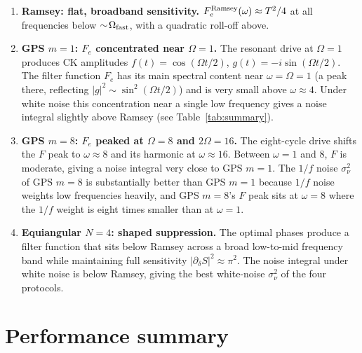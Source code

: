 \documentclass[12pt]{article}
\begin{document}
\begin{enumerate}

    \item \textbf{Ramsey: flat, broadband sensitivity.}
          $F_e^{\rm Ramsey}(\omega) \approx T^2/4$ at all frequencies below
          $\sim\!\Omega_{\rm fast}$, with a quadratic roll-off above.

    \item \textbf{GPS $m=1$: $F_e$ concentrated near $\Omega = 1$.}
          The resonant drive at $\Omega = 1$ produces CK amplitudes
          $f(t) = \cos(\Omega t/2)$, $g(t) = -i\sin(\Omega t/2)$.
          The filter function $F_e$ has its main spectral content near
          $\omega = \Omega = 1$ (a peak there, reflecting $|g|^2 \sim \sin^2(\Omega t/2)$)
          and is very small above $\omega \approx 4$.
          Under white noise this concentration near a single low frequency
          gives a noise integral slightly above Ramsey (see Table~\ref{tab:summary}).

    \item \textbf{GPS $m=8$: $F_e$ peaked at $\Omega = 8$ and $2\Omega = 16$.}
          The eight-cycle drive shifts the $F$ peak to $\omega \approx 8$
          and its harmonic at $\omega \approx 16$.  Between $\omega = 1$ and $8$,
          $F$ is moderate, giving a noise integral very close to GPS $m=1$.  The $1/f$ noise $\sigma^2_\nu$ of GPS $m=8$
          is substantially better than GPS $m=1$ because $1/f$ noise weights
          low frequencies heavily, and GPS $m=8$'s $F$ peak sits at $\omega = 8$
          where the $1/f$ weight is eight times smaller than at $\omega = 1$.

    \item \textbf{Equiangular $N=4$: shaped suppression.}
          The optimal phases produce a filter function that sits below Ramsey
          across a broad low-to-mid frequency band while maintaining full
          sensitivity $|\partial_\delta S|^2 \approx \pi^2$.
          The noise integral under white noise is below Ramsey,
          giving the best white-noise $\sigma^2_\nu$ of the four protocols.

\end{enumerate}


\section{Performance summary}
\end{document}
